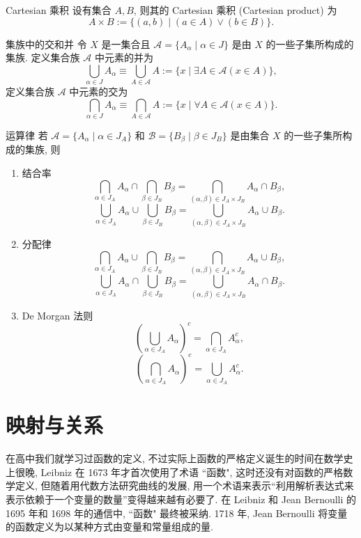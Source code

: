 \documentclass[cn,toc=twocol]{elegantbook}
\newcommand{\ITEMS}{\begin{enumerate}}
\newcommand{\ITEME}{\end{enumerate}}
\begin{document}
\begin{definition}{Cartesian 乘积}
	设有集合 $A, B$, 则其的 Cartesian 乘积 (Cartesian product) 为
	\[
		A \times B := \{(a,b)\mid(a \in A) \lor (b \in B)\}.
	\]
\end{definition}


\begin{definition}{集族中的交和并}
	令 $X$ 是一集合且 $\mathscr{A} = \{A_\alpha \mid\alpha \in J\}$ 是由 $X$ 的一些子集所构成的集族. 定义集合族 $\mathscr{A}$ 中元素的并为
	\[
		\bigcup_{\alpha \in J} A_\alpha \equiv \bigcup_{A \in \mathscr{A}} A := \{x \mid \exists A \in \mathscr{A} (x \in A)\},
	\]
	定义集合族 $\mathscr{A}$ 中元素的交为
	\[
		\bigcap_{\alpha \in J} A_\alpha \equiv \bigcap_{A \in \mathscr{A}} A := \{x \mid \forall A \in \mathscr{A} (x \in A)\}.
	\]
\end{definition}

\begin{theorem}{运算律}
	若 $\mathscr{A} = \{A_\alpha \mid \alpha \in J_A\}$ 和 $\mathscr{B} = \{B_\beta \mid \beta \in J_B\}$ 是由集合 $X$ 的一些子集所构成的集族, 则
	\ITEMS
		\item 结合率
		\[
			\bigcap_{\alpha\in J_A} A_\alpha \cap \bigcap_{\beta\in J_B} B_\beta = \bigcap_{(\alpha,\beta)\in J_A \times J_B} A_\alpha \cap B_\beta,
		\]
		\[
			\bigcup_{\alpha\in J_A} A_\alpha \cup \bigcup_{\beta\in J_B} B_\beta = \bigcup_{(\alpha,\beta)\in J_A \times J_B} A_\alpha \cup B_\beta.
		\]
		\item 分配律
		\[
			\bigcap_{\alpha\in J_A} A_\alpha \cup \bigcap_{\beta\in J_B} B_\beta = \bigcap_{(\alpha,\beta)\in J_A \times J_B} A_\alpha \cup B_\beta,
		\]
		\[
			\bigcup_{\alpha\in J_A} A_\alpha \cap \bigcup_{\beta\in J_B} B_\beta = \bigcup_{(\alpha,\beta)\in J_A \times J_B} A_\alpha \cap B_\beta.
		\]
		\item De Morgan 法则
		\[
			\left(\bigcup_{\alpha\in J_A} A_\alpha\right)^c = \bigcap_{\alpha\in J_A} A_\alpha^c,
		\]
		\[
			\left(\bigcap_{\alpha\in J_A} A_\alpha\right)^c = \bigcup_{\alpha\in J_A} A_\alpha^c.
		\]
	\ITEME
\end{theorem}

\section{映射与关系}

在高中我们就学习过函数的定义, 不过实际上函数的严格定义诞生的时间在数学史上很晚, Leibniz 在 1673 年才首次使用了术语 ``函数", 这时还没有对函数的严格数学定义, 但随着用代数方法研究曲线的发展, 用一个术语来表示“利用解析表达式来表示依赖于一个变量的数量”变得越来越有必要了. 在 Leibniz 和 Jean Bernoulli 的 1695 年和 1698 年的通信中, ``函数" 最终被采纳. 1718 年, Jean Bernoulli 将变量的函数定义为以某种方式由变量和常量组成的量.
\end{document}
